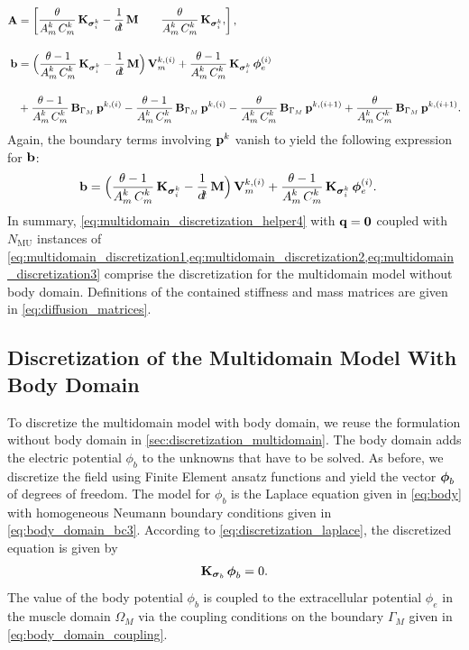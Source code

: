 \begin{align}
 \bfA &= \matt{
    \dfrac{\theta}{A_m^k\,C_m^k}\bfK_{\bfsigma_i^k} -\dfrac{1}{\dt}\bfM & \quad
    \dfrac{\theta}{A_m^k\,C_m^k}\bfK_{\bfsigma_i^k},
  },\label{eq:multidomain_discretization2} \\[4mm]
  \bfb &= \Big( \dfrac{\theta-1}{A_m^k\,C_m^k}\bfK_{\bfsigma_i^k} - \dfrac{1}{\dt}\bfM\Big)\,\bfV_m^{k,(i)} 
    + \dfrac{\theta - 1}{A_m^k\,C_m^k}\bfK_{\bfsigma_i^k}\,\bfphi_e^{(i)}\nonumber \\[4mm]
  & +\dfrac{\theta-1}{A_m^k\,C_m^k}\bfB_{\Gamma_M}\,\bfp^{k,(i)} - \dfrac{\theta-1}{A_m^k\,C_m^k}\bfB_{\Gamma_M}\,\bfp^{k,(i)}
  -\dfrac{\theta}{A_m^k\,C_m^k}\bfB_{\Gamma_M}\,\bfp^{k,(i+1)} + \dfrac{\theta}{A_m^k\,C_m^k}\bfB_{\Gamma_M}\,\bfp^{k,(i+1)}.\nonumber 
\end{align}
Again, the boundary terms involving $\textbf{p}^k$ vanish to yield the following expression for $\textbf{b}$:%
\begin{align}\label{eq:multidomain_discretization3}
    \bfb &= \Big( \dfrac{\theta-1}{A_m^k\,C_m^k}\bfK_{\bfsigma_i^k} - \dfrac{1}{\dt}\bfM\Big)\,\bfV_m^{k,(i)} 
      + \dfrac{\theta - 1}{A_m^k\,C_m^k}\bfK_{\bfsigma_i^k}\,\bfphi_e^{(i)}.
\end{align}
In summary, \cref{eq:multidomain_discretization_helper4} with $\textbf{q}=\textbf{0}$ coupled with $N_\text{MU}$  instances of \cref{eq:multidomain_discretization1,eq:multidomain_discretization2,eq:multidomain_discretization3} comprise the discretization for the multidomain model without body domain. Definitions of the contained stiffness and mass matrices are given in \cref{eq:diffusion_matrices}.

\subsection{Discretization of the Multidomain Model With Body Domain}

To discretize the multidomain model with body domain, we reuse the formulation without body domain in \cref{sec:discretization_multidomain}.
The body domain adds the electric potential $\phi_b$ to the unknowns that have to be solved. As before, we discretize the field using Finite Element ansatz functions and yield the vector $\boldsymbol{\phi}_b$ of degrees of freedom. The model for $\phi_b$ is the Laplace equation given in \cref{eq:body} with homogeneous Neumann boundary conditions given in \cref{eq:body_domain_bc3}. According to \cref{eq:discretization_laplace}, the discretized equation is given by
\begin{align}\label{eq:discretized_body}
  \textbf{K}_{\boldsymbol{\sigma}_b}\,\boldsymbol{\phi}_b = 0.
\end{align}
The value of the body potential $\phi_b$ is coupled to the extracellular potential $\phi_e$ in the muscle domain $\Omega_M$ via the coupling conditions on the boundary $\Gamma_M$ given in \cref{eq:body_domain_coupling}.


